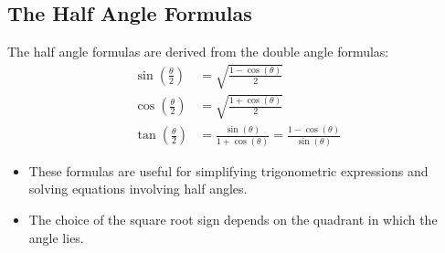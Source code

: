 \subsection{The Half Angle Formulas}
The half angle formulas are derived from the double angle formulas:
\begin{align}
    \sin\left(\frac{\theta}{2}\right) &= \sqrt{\frac{1 - \cos(\theta)}{2}} \\
    \cos\left(\frac{\theta}{2}\right) &= \sqrt{\frac{1 + \cos(\theta)}{2}} \\
    \tan\left(\frac{\theta}{2}\right) &= \frac{\sin(\theta)}{1 + \cos(\theta)} = \frac{1 - \cos(\theta)}{\sin(\theta)}
\end{align}
\begin{itemize}
    \item These formulas are useful for simplifying trigonometric expressions and solving equations involving half angles.
    \item The choice of the square root sign depends on the quadrant in which the angle lies.
\end{itemize}

